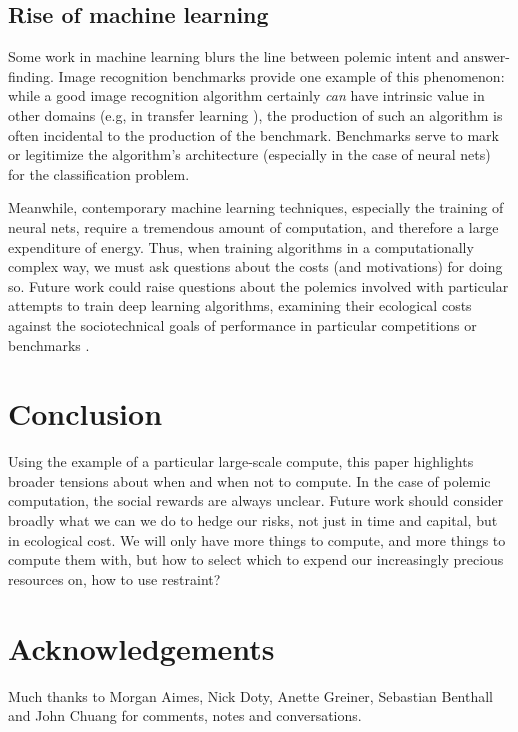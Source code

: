 \documentclass[sigconf]{acmart}
\begin{document}
\subsection{Rise of machine learning}
\label{sec:orgdf80700}

Some work in machine learning blurs the line 
between polemic intent and answer-finding.
Image recognition benchmarks provide one example of this phenomenon:
while a good image recognition algorithm certainly \emph{can} have intrinsic value in other domains 
(e.g, in transfer learning \cite{Jean2016f}),
the production of such an algorithm is often incidental to the production of the benchmark.
Benchmarks serve to mark or legitimize the algorithm's architecture (especially in the case of neural nets)
for the classification problem.

Meanwhile, contemporary machine learning techniques, especially the training of neural nets, 
require a tremendous amount of computation, and therefore a large expenditure of energy.
Thus, when training algorithms in a computationally complex way,
we must ask questions about the costs (and motivations) for doing so.
Future work could raise questions about the polemics involved
with particular attempts to train deep learning algorithms,
examining their ecological costs against the sociotechnical goals 
of performance in particular competitions or benchmarks \cite{SixSilberman2015}.


\section{Conclusion}
\label{sec:org93cc0a6}

Using the example of a particular large-scale compute,
this paper highlights broader tensions about when and when not to compute.
In the case of polemic computation, the social rewards are always unclear.
Future work should consider broadly what we can we do to hedge our risks, 
not just in time and capital,
but in ecological cost.
We will only have more things to compute,
and more things to compute them with,
but how to select which to expend our increasingly precious resources on, 
how to use restraint?


\section{Acknowledgements}
\label{sec:orgd1f0001}
Much thanks to Morgan Aimes, Nick Doty, Anette Greiner, Sebastian Benthall and John Chuang for comments, notes and conversations.



\end{document}
